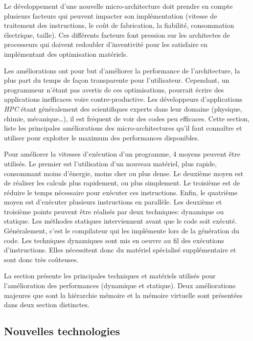 Le développement d'une nouvelle micro-architecture doit prendre en compte plusieurs facteurs qui peuvent impacter son implémentation (vitesse de traitement des instructions, le coût de fabrication, la fiabilité, consommation électrique, taille). Ces différents facteurs font pression sur les architectes de processeurs qui doivent redoubler d'inventivité pour les satisfaire en implémentant des optimisation matériels.

Les améliorations ont pour but d’améliorer la performance de l’architecture, la plus part du temps de façon transparente pour l’utilisateur. Cependant, un programmeur n’étant pas avertis de ces optimisations, pourrait écrire des applications inefficaces voire contre-productive. Les développeurs d’applications \textit{HPC} étant généralement des scientifiques experts dans leur domaine (physique, chimie, mécanique…), il est fréquent de voir des codes peu efficaces. Cette section, liste les principales améliorations des micro-architectures qu'il faut connaître et utiliser pour exploiter le maximum des performances disponibles. 


Pour améliorer la vitesses d’exécution d’un programme, 4 moyens peuvent être utilisés.
Le premier est l’utilisation d’un nouveau matériel, plus rapide, consommant moins d'énergie, moins cher ou plus dense.
Le deuxième moyen est de réaliser les calculs plus rapidement, ou plus simplement. 
Le troisième est de réduire le temps nécessaire pour exécuter ces instructions. 
Enfin, le quatrième moyen est d’exécuter plusieurs instructions en parallèle. Les deuxième et troisième points peuvent être réalisés par deux techniques: dynamique ou statique.
Les méthodes statiques interviennent avant que le code soit exécuté. Généralement, c’est le compilateur qui les implémente lors de la génération du code. Les techniques dynamiques sont mis en oeuvre au fil des exécutions d’instructions. Elles nécessitent donc du matériel spécialisé supplémentaire et sont donc très coûteuses. 

La section présente les principales techniques et matériels utilisés pour l’amélioration des performances (dynamique et statique). Deux améliorations majeures que sont la hiérarchie mémoire et la mémoire virtuelle sont présentées dans deux section distinctes.





\subsection{Nouvelles technologies}

